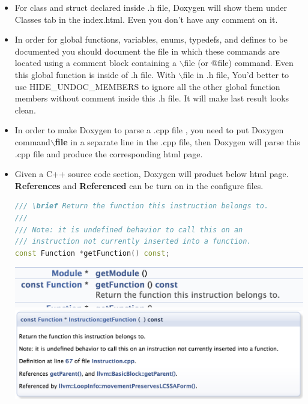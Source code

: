 \documentclass[a4paper,12pt,twoside]{book}
\begin{document}
\begin{itemize}
\item For class and struct declared inside .h file, Doxygen will show them under Classes tab in the index.html. Even you don't have any comment on it.

\item In order for global functions, variables, enums, typedefs, and defines to be documented you should document the file in which these commands are located using a comment block containing a $\backslash$file (or @file) command. Even this global function is inside of .h file. With $\backslash$file in .h file, You'd better to use HIDE\_UNDOC\_MEMBERS to ignore all the other global function members without comment inside this .h file. It will make last result looks clean. 

\item In order to make Doxygen to parse a .cpp file , you need to put Doxygen command\textbf{$\backslash$file} in a separate line in the .cpp file, then Doxygen will parse this .cpp file and produce the corresponding html page.

\item Given a C++ source code section, Doxygen will product below html page.  \textbf{References} and \textbf{Referenced} can be turn on in the configure files.

\begin{lstlisting}[frame=single, language=c++]
/// \brief Return the function this instruction belongs to.
///
/// Note: it is undefined behavior to call this on an
/// instruction not currently inserted into a function.
const Function *getFunction() const;
\end{lstlisting}

\includegraphics[scale=0.45]{pics/dox1.png} \newline
\includegraphics[scale=0.45]{pics/dox2.png} \newline

\end{itemize}
\end{document}
